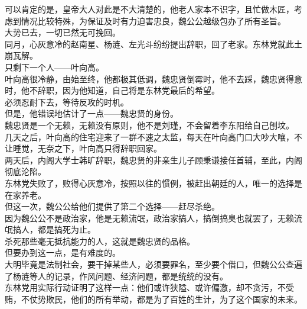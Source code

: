 \begin{multicols}{\theparacolNo}
可以肯定的是，皇帝大人对此是不大清楚的，他老人家本不识字，且忙做木匠，考虑到情况比较特殊，为保证及时有力迫害忠良，魏公公越级包办了所有圣旨。\\

大势已去，一切已然无可挽回。\\

同月，心灰意冷的赵南星、杨涟、左光斗纷纷提出辞职，回了老家。东林党就此土崩瓦解。\\

只剩下一个人——叶向高。\\

叶向高很冷静，由始至终，他都极其低调，魏忠贤倒霉时，他不去踩，魏忠贤得意时，他不辞职，因为他知道，自己将是东林党最后的希望。\\

必须忍耐下去，等待反攻的时机。\\

但是，他错误地估计了一点——魏忠贤的身份。\\

魏忠贤是一个无赖，无赖没有原则，他不是刘瑾，不会留着李东阳给自己刨坟。\\

几天之后，叶向高的住宅迎来了一群不速之太监，每天在叶向高门口大吵大嚷，不让睡觉，无奈之下，叶向高只得辞职回家。\\

两天后，内阁大学士韩旷辞职，魏忠贤的非亲生儿子顾秉谦接任首辅，至此，内阁彻底沦陷。\\

东林党失败了，败得心灰意冷，按照以往的惯例，被赶出朝廷的人，唯一的选择是在家养老。\\

但这一次，魏公公给他们提供了第二个选择——赶尽杀绝。\\

因为魏公公不是政治家，他是无赖流氓，政治家搞人，搞倒搞臭也就罢了，无赖流氓搞人，都是搞死为止。\\

杀死那些毫无抵抗能力的人，这就是魏忠贤的品格。\\

但要办到这一点，是有难度的。\\

大明毕竟是法制社会，要干掉某些人，必须要罪名，至少要个借口，但魏公公查遍了杨涟等人的记录，作风问题、经济问题，都是统统的没有。\\

东林党用实际行动证明了这样一点：他们或许狭隘、或许偏激，却不贪污，不受贿，不仗势欺民，他们的所有举动，都是为了百姓的生计，为了这个国家的未来。\\


\end{multicols}
